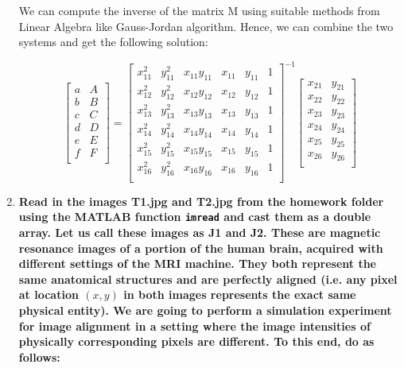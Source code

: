 \documentclass{article}
\begin{document}
\begin{enumerate}
We can compute the inverse of the matrix M using suitable methods from Linear Algebra like Gauss-Jordan algorithm. Hence, we can combine the two systems and get the following solution:

\begin{equation}
    \begin{bmatrix}
    a & A\\
    b & B\\
    c & C\\
    d & D\\
    e & E\\
    f & F\\
    \end{bmatrix}
          =
    \begin{bmatrix}
        x_{11}^2 & y_{11}^2 & x_{11}y_{11} & x_{11} & y_{11} & 1\\
        x_{12}^2 & y_{12}^2 & x_{12}y_{12} & x_{12} & y_{12} & 1\\
        x_{13}^2 & y_{13}^2 & x_{13}y_{13} & x_{13} & y_{13} & 1\\
        x_{14}^2 & y_{14}^2 & x_{14}y_{14} & x_{14} & y_{14} & 1\\
        x_{15}^2 & y_{15}^2 & x_{15}y_{15} & x_{15} & y_{15} & 1\\
        x_{16}^2 & y_{16}^2 & x_{16}y_{16} & x_{16} & y_{16} & 1\\
    \end{bmatrix}^{-1}
    \begin{bmatrix}
    x_{21} & y_{21} \\
    x_{22} & y_{22} \\
    x_{23} & y_{23} \\
    x_{24} & y_{24} \\
    x_{25} & y_{25} \\
    x_{26} & y_{26} \\
    \end{bmatrix}
\end{equation}

\newpage
\item \textbf{Read in the images T1.jpg and T2.jpg from the homework folder using the MATLAB function \texttt{imread} and cast them as a double array. Let us call these images as J1 and J2. These are magnetic resonance images of a portion of the human brain, acquired with different settings of the MRI machine. They both represent the same anatomical structures and are perfectly aligned (i.e. any pixel at location $(x,y)$ in both images represents the exact same physical entity). We are going to perform a simulation experiment for image alignment in a setting where the image intensities of physically corresponding pixels are different. To this end, do as follows:}


\end{enumerate}
\end{document}
